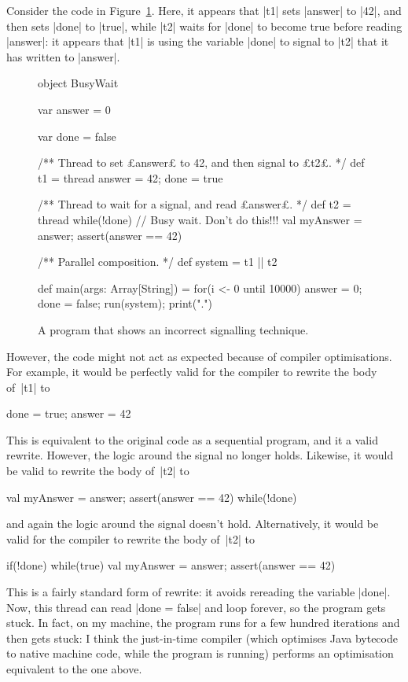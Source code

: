 Consider the code in Figure~\ref{fig:busyWait}.  Here, it appears that |t1|
sets |answer| to |42|, and then sets |done| to |true|, while |t2| waits for
|done| to become true before reading |answer|: it appears that |t1| is using
the variable |done| to signal to |t2| that it has written to |answer|.

\begin{figure}
\begin{scala}
object BusyWait{
  var answer = 0

  var done = false

  /** Thread to set £answer£ to 42, and then signal to £t2£. */
  def t1 = thread{ answer = 42; done = true }

  /** Thread to wait for a signal, and read £answer£. */
  def t2 = thread{
    while(!done){ } // Busy wait.  Don't do this!!!
    val myAnswer = answer; assert(answer == 42)
  }

  /** Parallel composition. */
  def system = t1 || t2

  def main(args: Array[String]) = { 
    for(i <- 0 until 10000){ answer = 0; done = false; run(system); print(".") }
  }
}
\end{scala}
\caption{A program that shows an incorrect signalling technique.}
\label{fig:busyWait}
\end{figure}

However, the code might not act as expected because of compiler
optimisations.  For example, it would be perfectly valid for the compiler to
rewrite the body of~|t1| to
\begin{scala}
  done = true; answer = 42
\end{scala}
%
This is equivalent to the original code as a sequential program, and it a
valid rewrite.  However, the logic around the signal no longer holds.
Likewise, it would be valid to rewrite the body of~|t2| to
\begin{scala}
  val myAnswer = answer; assert(answer == 42)
  while(!done){ } 
\end{scala}
and again the logic around the signal doesn't hold.  Alternatively, it would
be valid for the compiler to rewrite the body of~|t2| to
% 
\begin{scala}
  if(!done){ while(true){ } }
  val myAnswer = answer; assert(answer == 42)
\end{scala}
This is a fairly standard form of rewrite: it avoids rereading the variable
|done|.  Now, this thread can read |done = false| and loop forever, so the
program gets stuck.  In fact, on my machine, the program runs for a few
hundred iterations and then gets stuck: I think the just-in-time compiler
(which optimises Java bytecode to native machine code, while the program is
running) performs an optimisation equivalent to the one above.

